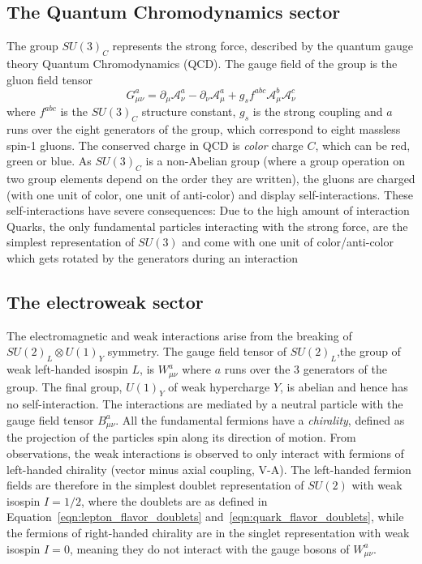 \subsection{The Quantum Chromodynamics sector}
\label{sec:theory:qcd}
The group $SU(3)_C$ represents the strong force, described by the quantum gauge theory Quantum Chromodynamics (QCD). The gauge field of the group is the gluon field tensor 
\begin{equation}
G_{\mu\nu}^a=\partial_{\mu} \mathcal{A}_{\nu}^a-\partial_{\nu} \mathcal{A}_{\mu}^a+g_s f^{abc}\mathcal{A}_{\mu}^b\mathcal{A}_{\nu}^c
\end{equation}
where $f^{abc}$ is the $SU(3)_C$ structure constant, $g_s$ is the strong coupling and $a$ runs over the eight generators of the group, which correspond to eight massless spin-1 gluons. The conserved charge in QCD is \emph{color} charge $C$, which can be red, green or blue. As $SU(3)_C$ is a non-Abelian group (where a group operation on two group elements depend on the order they are written), the gluons are charged (with one unit of color, one unit of anti-color) and display self-interactions. These self-interactions have severe consequences: Due to the high amount of interaction
Quarks, the only fundamental particles interacting with the strong force, are the simplest representation of $SU(3)$ and come with one unit of color/anti-color which gets rotated by the generators during an interaction 
\subsection{The electroweak sector}
The electromagnetic and weak interactions arise from the breaking of $SU (2)_L \otimes U(1)_Y$ symmetry. The gauge field tensor of $SU (2)_L$,the group of weak left-handed isospin $L$, is $W_{\mu\nu}^a$ where $a$ runs over the 3 generators of the group. The final group, $U(1)_Y$ of weak hypercharge $Y$, is abelian and hence has no self-interaction. The interactions are mediated by a neutral particle with the gauge field tensor $B_{\mu\nu}^a$.\newline
All the fundamental fermions have a \emph{chirality}, defined as the projection of the particles spin along its direction of motion. From observations, the weak interactions is observed to only interact with fermions of left-handed chirality (vector minus axial coupling, V-A). The left-handed fermion fields are therefore in the simplest doublet representation of $SU(2)$ with weak isospin $I=1/2$, where the doublets are as defined in Equation~\ref{eqn:lepton_flavor_doublets} and~\ref{eqn:quark_flavor_doublets}, while the fermions of right-handed chirality are in the singlet representation with weak isospin $I=0$, meaning they do not interact with the gauge bosons of $W_{\mu\nu}^a$.

